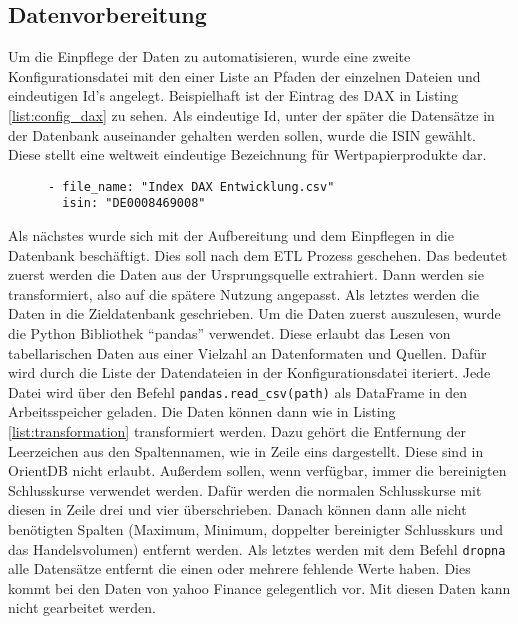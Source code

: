 \subsection{Datenvorbereitung}
\label{sec:datenvorbereitung}

Um die Einpflege der Daten zu automatisieren, wurde eine zweite Konfigurationsdatei mit den einer Liste an Pfaden der einzelnen Dateien und eindeutigen Id's angelegt. Beispielhaft ist der Eintrag des DAX in Listing \ref{list:config_dax} zu sehen. Als eindeutige Id, unter der später die Datensätze in der Datenbank auseinander gehalten werden sollen, wurde die \gls{ISIN} gewählt. Diese stellt eine weltweit eindeutige Bezeichnung für Wertpapierprodukte dar.

\begin{figure}[!htb]
    \begin{lstlisting}[caption=Konfigeintrag des DAX, label=list:config_dax]
- file_name: "Index DAX Entwicklung.csv"
  isin: "DE0008469008"
    \end{lstlisting}
\end{figure}

Als nächstes wurde sich mit der Aufbereitung und dem Einpflegen in die Datenbank beschäftigt. Dies soll nach dem \gls{ETL} Prozess geschehen. Das bedeutet zuerst werden die Daten aus der Ursprungsquelle extrahiert. Dann werden sie transformiert, also auf die spätere Nutzung angepasst. Als letztes werden die Daten in die Zieldatenbank geschrieben. Um die Daten zuerst auszulesen, wurde die Python Bibliothek \enquote{pandas} verwendet. Diese erlaubt das Lesen von tabellarischen Daten aus einer Vielzahl an Datenformaten und Quellen. Dafür wird durch die Liste der Datendateien in der Konfigurationsdatei iteriert. Jede Datei wird über den Befehl \texttt{pandas.read\_csv(path)} als DataFrame in den Arbeitsspeicher geladen. Die Daten können dann wie in Listing \ref{list:transformation} transformiert werden. Dazu gehört die Entfernung der Leerzeichen aus den Spaltennamen, wie in Zeile eins dargestellt. Diese sind in OrientDB nicht erlaubt. Außerdem sollen, wenn verfügbar, immer die bereinigten Schlusskurse verwendet werden. Dafür werden die normalen Schlusskurse mit diesen in Zeile drei und vier überschrieben. Danach können dann alle nicht benötigten Spalten (Maximum, Minimum, doppelter bereinigter Schlusskurs und das Handelsvolumen) entfernt werden. Als letztes werden mit dem Befehl \texttt{dropna} alle Datensätze entfernt die einen oder mehrere fehlende Werte haben. Dies kommt bei den Daten von yahoo Finance gelegentlich vor. Mit diesen Daten kann nicht gearbeitet werden.

